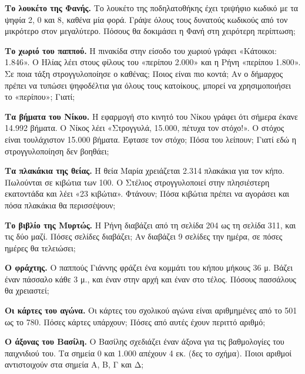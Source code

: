 
\ex \textbf{Το λουκέτο της Φανής.} Το λουκέτο της ποδηλατοθήκης έχει τριψήφιο κωδικό με τα ψηφία 2, 0 και 8, καθένα μία φορά. Γράψε όλους τους δυνατούς κωδικούς από τον μικρότερο στον μεγαλύτερο. Πόσους θα δοκιμάσει η Φανή στη χειρότερη περίπτωση;

\ex \textbf{Το χωριό του παππού.} Η πινακίδα στην είσοδο του χωριού γράφει «Κάτοικοι: 1.846». Ο Ηλίας λέει στους φίλους του «περίπου 2.000» και η Ρήνη «περίπου 1.800». Σε ποια τάξη στρογγυλοποίησε ο καθένας; Ποιος είναι πιο κοντά; Αν ο δήμαρχος πρέπει να τυπώσει ψηφοδέλτια για όλους τους κατοίκους, μπορεί να χρησιμοποιήσει το «περίπου»; Γιατί;

\ex \textbf{Τα βήματα του Νίκου.} Η εφαρμογή στο κινητό του Νίκου γράφει ότι σήμερα έκανε 14.992 βήματα. Ο Νίκος λέει «Στρογγυλά, 15.000, πέτυχα τον στόχο!». Ο στόχος είναι τουλάχιστον 15.000 βήματα. Έφτασε τον στόχο; Πόσα του λείπουν; Γιατί εδώ η στρογγυλοποίηση δεν βοηθάει;

\ex \textbf{Τα πλακάκια της θείας.} Η θεία Μαρία χρειάζεται 2.314 πλακάκια για τον κήπο. Πωλούνται σε κιβώτια των 100. Ο Στέλιος στρογγυλοποιεί στην πλησιέστερη εκατοντάδα και λέει «23 κιβώτια». Φτάνουν; Πόσα κιβώτια πρέπει να αγοράσει και πόσα πλακάκια θα περισσέψουν;

\ex \textbf{Το βιβλίο της Μυρτώς.} Η Ρήνη διαβάζει από τη σελίδα 204 ως τη σελίδα 311, και τις δύο μαζί. Πόσες σελίδες διαβάζει; Αν διαβάζει 9 σελίδες την ημέρα, σε πόσες ημέρες θα τελειώσει;

\ex \textbf{Ο φράχτης.} Ο παππούς Γιάννης φράζει ένα κομμάτι του κήπου μήκους 36 μ. Βάζει έναν πάσσαλο κάθε 3 μ., και έναν στην αρχή και έναν στο τέλος. Πόσους πασσάλους θα χρειαστεί;

\ex \textbf{Οι κάρτες του αγώνα.} Οι κάρτες του σχολικού αγώνα είναι αριθμημένες από το 501 ως το 780. Πόσες κάρτες υπάρχουν; Πόσες από αυτές έχουν περιττό αριθμό;

\ex \textbf{Ο άξονας του Βασίλη.} Ο Βασίλης σχεδιάζει έναν άξονα για τις βαθμολογίες του παιχνιδιού του. Τα σημεία 0 και 1.000 απέχουν 4 εκ. (δες το σχήμα). Ποιοι αριθμοί αντιστοιχούν στα σημεία Α, Β, Γ και Δ;

\begin{center}
\end{center}

